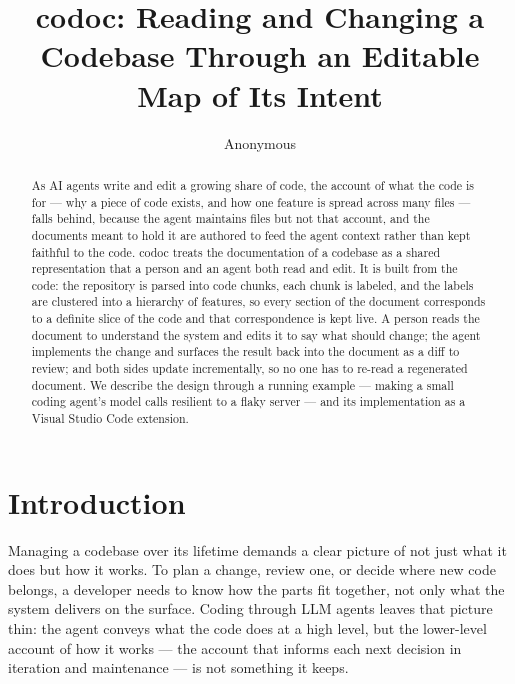 \documentclass[sigconf,nonacm]{acmart}
\begin{document}
\title{codoc: Reading and Changing a Codebase Through an Editable Map of Its Intent}

\author{Anonymous}

\begin{abstract}
As AI agents write and edit a growing share of code, the account of what the code
is for --- why a piece of code exists, and how one feature is spread across many
files --- falls behind, because the agent maintains files but not that account,
and the documents meant to hold it are authored to feed the agent context rather
than kept faithful to the code. codoc treats the documentation of a codebase as a
shared representation that a person and an agent both read and edit. It is built
from the code: the repository is parsed into code chunks, each chunk is labeled,
and the labels are clustered into a hierarchy of features, so every section of the
document corresponds to a definite slice of the code and that correspondence is
kept live. A person reads the document to understand the system and edits it to
say what should change; the agent implements the change and surfaces the result
back into the document as a diff to review; and both sides update incrementally,
so no one has to re-read a regenerated document. We describe the design through a
running example --- making a small coding agent's model calls resilient to a flaky
server --- and its implementation as a Visual Studio Code extension.
\end{abstract}


\maketitle

\section{Introduction}

Managing a codebase over its lifetime demands a clear picture of not just what it
does but how it works. To plan a change, review one, or decide where new code
belongs, a developer needs to know how the parts fit together, not only what the
system delivers on the surface. Coding through LLM agents leaves that picture
thin: the agent conveys what the code does at a high level, but the lower-level
account of how it works --- the account that informs each next decision in
iteration and maintenance --- is not something it keeps.
\end{document}
